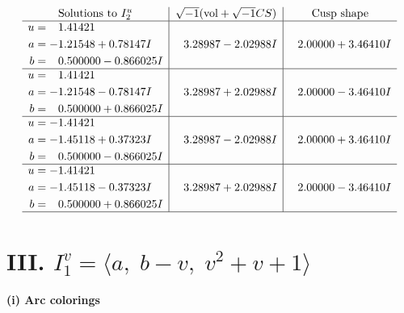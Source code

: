 \documentclass[1p]{elsarticle_modified}
\theoremstyle{definition}
\newcommand{\I}{\sqrt{-1}}
\begin{document}
$$\begin{array}{c|c|c}  
\text{Solutions to }I^u_{2}& \I (\text{vol} + \sqrt{-1}CS) & \text{Cusp shape}\\
 \hline 
\begin{aligned}
u &= \phantom{-}1.41421\phantom{ +0.000000I} \\
a &= -1.21548 + 0.78147 I \\
b &= \phantom{-}0.500000 - 0.866025 I\end{aligned}
 & \phantom{-}3.28987 - 2.02988 I & \phantom{-}2.00000 + 3.46410 I \\ \hline\begin{aligned}
u &= \phantom{-}1.41421\phantom{ +0.000000I} \\
a &= -1.21548 - 0.78147 I \\
b &= \phantom{-}0.500000 + 0.866025 I\end{aligned}
 & \phantom{-}3.28987 + 2.02988 I & \phantom{-}2.00000 - 3.46410 I \\ \hline\begin{aligned}
u &= -1.41421\phantom{ +0.000000I} \\
a &= -1.45118 + 0.37323 I \\
b &= \phantom{-}0.500000 - 0.866025 I\end{aligned}
 & \phantom{-}3.28987 - 2.02988 I & \phantom{-}2.00000 + 3.46410 I \\ \hline\begin{aligned}
u &= -1.41421\phantom{ +0.000000I} \\
a &= -1.45118 - 0.37323 I \\
b &= \phantom{-}0.500000 + 0.866025 I\end{aligned}
 & \phantom{-}3.28987 + 2.02988 I & \phantom{-}2.00000 - 3.46410 I\\
 \hline 
 \end{array}$$\newpage\newpage\renewcommand{\arraystretch}{1}
\centering \section*{III. $I^v_{1}= \langle a,\;b- v,\;v^2+v+1 \rangle$}
\flushleft \textbf{(i) Arc colorings}\\
\end{document}
